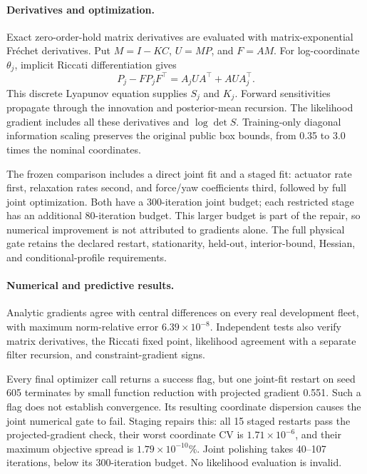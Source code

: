 \paragraph{Derivatives and optimization.}
Exact zero-order-hold matrix derivatives are evaluated with matrix-exponential
Fr\'echet derivatives. Put $M=I-KC$, $U=MP$, and $F=AM$. For log-coordinate
$\theta_j$, implicit Riccati differentiation gives
\begin{equation}
 P_j-FP_jF^\top=A_jUA^\top+AUA_j^\top.
\end{equation}
This discrete Lyapunov equation supplies $S_j$ and $K_j$. Forward
sensitivities propagate through the innovation and posterior-mean recursion.
The likelihood gradient includes all these derivatives and $\log\det S$.
Training-only diagonal information scaling preserves the original public box
bounds, from 0.35 to 3.0 times the nominal coordinates.

The frozen comparison includes a direct joint fit and a staged fit:
actuator rate first, relaxation rates second, and force/yaw coefficients third,
followed by full joint optimization. Both have a 300-iteration joint budget;
each restricted stage has an additional 80-iteration budget. This larger budget
is part of the repair, so numerical improvement is not attributed to gradients
alone. The full physical gate retains the declared restart, stationarity,
held-out, interior-bound, Hessian, and conditional-profile requirements.

\paragraph{Numerical and predictive results.}
Analytic gradients agree with central differences on every real development
fleet, with maximum norm-relative error $6.39\times10^{-8}$. Independent tests
also verify matrix derivatives, the Riccati fixed point, likelihood agreement
with a separate filter recursion, and constraint-gradient signs.

Every final optimizer call returns a success flag, but one joint-fit restart
on seed 605 terminates by small function reduction with projected gradient
0.551. Such a flag does not establish convergence. Its resulting coordinate
dispersion causes the joint numerical gate to fail. Staging repairs this:
all 15 staged restarts pass the projected-gradient check, their worst
coordinate CV is $1.71\times10^{-6}$, and their maximum objective spread is
$1.79\times10^{-10}$\%. Joint polishing takes 40--107 iterations, below its
300-iteration budget. No likelihood evaluation is invalid.

